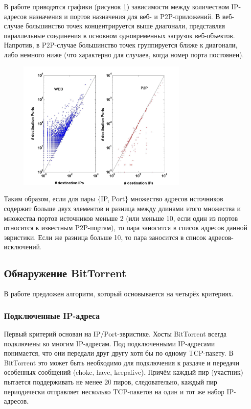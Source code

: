 \documentclass[bachelor, och, coursework]{SCWorks}
\begin{document}
В работе \cite{blinc} приводятся графики (рисунок \ref{IPPort4.jpg}) зависимости между количеством IP-адресов назначения и портов назначения для веб- и P2P-приложений. В веб-случае большинство точек концентрируется выше диагонали, представляя параллельные соединения в основном одновременных загрузок веб-объектов. Напротив, в P2P-случае большинство точек группируется ближе к диагонали, либо немного ниже (что характерно для случаев, когда номер порта постоянен).

\begin{figure}[H]
    \centering
    \includegraphics[width=0.75\textwidth]{IPPort4.jpg}
    \caption{}
    \label{IPPort4.jpg}
\end{figure}

Таким образом, если для пары \{IP, Port\} множество адресов источников содержит больше двух элементов и разница между длинами этого множества и множества портов источников меньше 2 (или меньше 10, если один из портов относится к известным P2P-портам), то пара заносится в список адресов данной эвристики. Если же разница больше 10, то пара заносится в список адресов-исключений. 

\subsection{Обнаружение BitTorrent}
В работе \cite{BitTorrent} предложен алгоритм, который основывается на четырёх критериях.

\subsubsection{Подключенные IP-адреса}
Первый критерий основан на IP/Port-эвристике. Хосты BitTorrent всегда подключены ко многим IP-адресам.
Под подключенными IP-адресами понимается, что они передали друг другу хотя бы
по одному TCP-пакету. В BitTorrent это может быть необходимо для подключения к раздаче и передачи особенных
сообщений (choke, have, keepalive). Причём каждый пир (участник) пытается поддерживать не менее 20 пиров, следовательно,
каждый пир периодически отправляет несколько TCP-пакетов на один и тот же набор IP-адресов.
\end{document}
